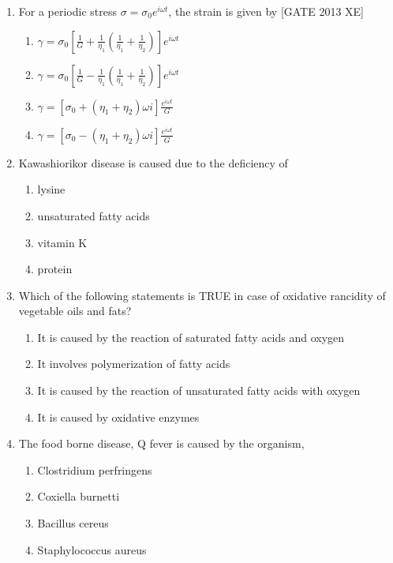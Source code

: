 \documentclass[journal,12pt,onecolumn]{IEEEtran}
\theoremstyle{remark}
\begin{document}
\begin{enumerate}
    \item For a periodic stress $\sigma = \sigma_0 e^{i \omega t}$, the strain is given by \hfill [GATE 2013 XE]
    \begin{multicols}{2}
    \begin{enumerate}
        \item $\gamma = \sigma_0 \left[ \frac{1}{G} + \frac{1}{\eta_1} \left( \frac{1}{\eta_1} + \frac{1}{\eta_2} \right) \right] e^{i \omega t}$
        \item $\gamma = \sigma_0 \left[ \frac{1}{G} - \frac{1}{\eta_1} \left( \frac{1}{\eta_1} + \frac{1}{\eta_2} \right) \right] e^{i \omega t}$
        \item $\gamma = \left[ \sigma_0 + (\eta_1 + \eta_2) \omega i \right] \frac{e^{i \omega t}}{G}$
        \item $\gamma = \left[ \sigma_0 - (\eta_1 + \eta_2) \omega i \right] \frac{e^{i \omega t}}{G}$
    \end{enumerate}
    \end{multicols}
    \item Kawashiorikor disease is caused due to the deficiency of
\begin{multicols}{2}
\begin{enumerate}
\item lysine
\item unsaturated fatty acids
\item vitamin K
\item protein
\end{enumerate}
\end{multicols}

\item Which of the following statements is TRUE in case of oxidative rancidity of vegetable oils and fats?
\begin{multicols}{2}
\begin{enumerate}
\item It is caused by the reaction of saturated fatty acids and oxygen
\item It involves polymerization of fatty acids
\item It is caused by the reaction of unsaturated fatty acids with oxygen
\item It is caused by oxidative enzymes
\end{enumerate}
\end{multicols}

\item The food borne disease, Q fever is caused by the organism,
\begin{multicols}{2}
\begin{enumerate}
\item Clostridium perfringens
\item Coxiella burnetti
\item Bacillus cereus
\item Staphylococcus aureus
\end{enumerate}
\end{multicols}


\end{enumerate}
\end{document}
